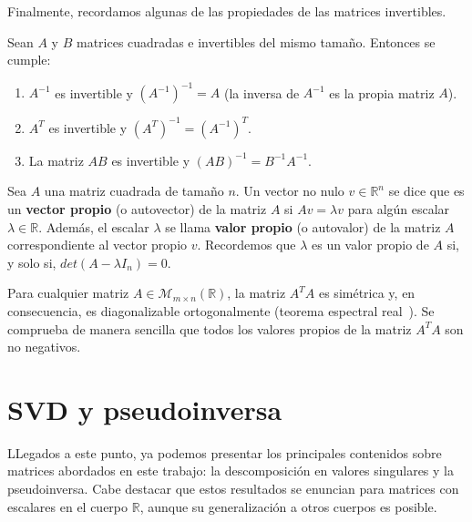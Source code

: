 Finalmente, recordamos algunas de las propiedades de las matrices invertibles.

\begin{proposicion}
    Sean $A$ y $B$ matrices cuadradas e invertibles del mismo tamaño. Entonces se cumple:

    \begin{enumerate}
        \item $A^{-1}$ es invertible y ${(A^{-1})}^{-1} = A$ (la inversa de $A^{-1}$ es la propia matriz $A$).
        \item $A^{T}$ es invertible y ${(A^{T})}^{-1} = {(A^{-1})}^{T}$.
        \item La matriz $AB$ es invertible y ${(AB)}^{-1} = B^{-1}A^{-1}$.\newline
    \end{enumerate}
\end{proposicion}

\begin{definicion}
    Sea $A$ una matriz cuadrada de tamaño $n$. Un vector no nulo $v \in \mathbb{R}^{n}$ se dice que es un \textbf{vector propio} (o autovector) de la matriz $A$ si $Av=\lambda v$ para algún escalar $\lambda \in \mathbb{R}$. Además, el escalar $\lambda$ se llama \textbf{valor propio} (o autovalor) de la matriz $A$ correspondiente al vector propio $v$. Recordemos que $\lambda$ es un valor propio de $A$ si, y solo si, $det(A-\lambda I_n)=0$.\newline
\end{definicion}

Para cualquier matriz $A \in \mathcal{M}_{m \times n}(\mathbb{R})$, la matriz $A^{T}A$ es simétrica y, en consecuencia, es diagonalizable ortogonalmente (teorema espectral real~\cite{Blum2021}). Se comprueba de manera sencilla que todos los valores propios de la matriz $A^{T}A$ son no negativos.\newline

\section{SVD y pseudoinversa}\label{sec:svd-pseudoinversa}

LLegados a este punto, ya podemos presentar los principales contenidos sobre matrices abordados en este trabajo: la descomposición en valores singulares y la pseudoinversa. Cabe destacar que estos resultados se enuncian para matrices con escalares en el cuerpo $\mathbb{R}$, aunque su generalización a otros cuerpos es posible.\newline

